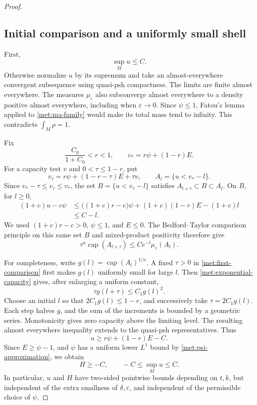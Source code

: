 \documentclass[11pt,letterpaper]{article}
\theoremstyle{definition}
\theoremstyle{remark}
\begin{document}
\begin{proof}
\subsection*{Initial comparison and a uniformly small shell}

First,
\begin{equation}
 \label{met:upper-u}
 \sup_M u\leq C.
\end{equation}
Otherwise normalize \(u\) by its supremum and take an almost-everywhere
convergent subsequence using quasi-psh compactness.  The limits are
finite almost everywhere.  The measures \(\mu_\varepsilon\) also
subconverge almost everywhere to a density positive almost everywhere,
including when \(\varepsilon\to0\).  Since \(\psi\leq1\), Fatou's
lemma applied to \eqref{met:ma-family} would make its total mass tend
to infinity.  This contradicts \(\int_M\rho=1\).

Fix
\[
 \frac{C_0}{1+C_0}<r<1,
 \qquad v_*=r\psi+(1-r)E.
\]
For a capacity test \(v\) and \(0<\tau\leq1-r\), put
\[
 v_\tau=r\psi+(1-r-\tau)E+\tau v,
 \qquad A_l=\{u<v_*-l\}.
\]
Since \(v_*-\tau\leq v_\tau\leq v_*\), the set
\(B=\{u<v_\tau-l\}\) satisfies
\(A_{l+\tau}\subset B\subset A_l\).  On \(B\), for \(l\geq0\),
\begin{align*}
 (1+c)u-c\psi
 &\leq\bigl((1+c)r-c\bigr)\psi
       +(1+c)(1-r)E-(1+c)l\\
 &\leq C-l.
\end{align*}
We used \((1+c)r-c>0\), \(\psi\leq1\), and \(E\leq0\).
The Bedford--Taylor comparison principle on this same set \(B\)
and mixed-product positivity therefore give
\begin{equation}
 \label{met:first-comparison}
 \tau^n\operatorname{cap}(A_{l+\tau})
 \leq C e^{-l}\mu_\varepsilon(A_l).
\end{equation}

For completeness, write \(g(l)=\operatorname{cap}(A_l)^{1/n}\).
A fixed \(\tau>0\) in \eqref{met:first-comparison} first makes
\(g(l)\) uniformly small for large \(l\).  Then
\eqref{met:exponential-capacity} gives, after enlarging a uniform
constant,
\[
 \tau g(l+\tau)\leq C_1 g(l)^2.
\]
Choose an initial \(l\) so that \(2C_1g(l)\leq1-r\), and successively
take \(\tau=2C_1g(l)\).  Each step halves \(g\), and the sum of the
increments is bounded by a geometric series.  Monotonicity gives
zero capacity above the limiting level.  The resulting almost
everywhere inequality extends to the quasi-psh representatives.
Thus
\begin{equation}
 \label{met:first-lower-bound}
 u\geq r\psi+(1-r)E-C.
\end{equation}
Since \(E\geq\psi-1\), and \(\psi\) has a uniform lower \(L^1\)
bound by \eqref{met:psi-approximation}, we obtain
\begin{equation}
 \label{met:H-normalization}
 H\geq-C,
 \qquad -C\leq\sup_M u\leq C.
\end{equation}
In particular, \(u\) and \(H\) have two-sided pointwise bounds
depending on \(t,k\), but independent of the extra smallness of
\(\delta,\varepsilon\), and independent of the permissible choice of
\(\psi\).


\end{proof}
\end{document}

